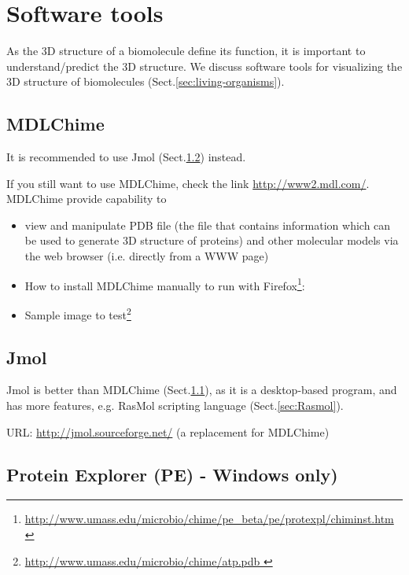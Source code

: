 \section{Software tools}
\label{sec:tools}

As the 3D structure of a biomolecule define its function, it is important to
understand/predict the 3D structure. We discuss software tools for visualizing
the 3D structure of biomolecules (Sect.\ref{sec:living-organisms}).

\subsection{MDLChime}
\label{sec:MDLChime}

It is recommended to use Jmol (Sect.\ref{sec:Jmol}) instead.

If you still want to use MDLChime, check the link \url{http://www2.mdl.com/}.
MDLChime provide capability to
\begin{itemize}

   \item view and manipulate PDB file (the file that contains information which
can be used to generate 3D structure of proteins) and other molecular models
via the web browser (i.e. directly from a WWW page)

   \item How to install MDLChime manually to run with
Firefox\footnote{\url{http://www.umass.edu/microbio/chime/pe_beta/pe/protexpl/chiminst.htm}}:

   \item Sample image to
test\footnote{\url{http://www.umass.edu/microbio/chime/atp.pdb }}
\end{itemize}

\subsection{Jmol}
\label{sec:Jmol}

Jmol is better than MDLChime (Sect.\ref{sec:MDLChime}), as it is a desktop-based
program, and has more features, e.g. RasMol scripting language
(Sect.\ref{sec:Rasmol}).

URL: \url{http://jmol.sourceforge.net/} (a replacement for MDLChime)

\subsection{Protein Explorer (PE) - Windows only)}
\label{sec:Protein-Explorer}


